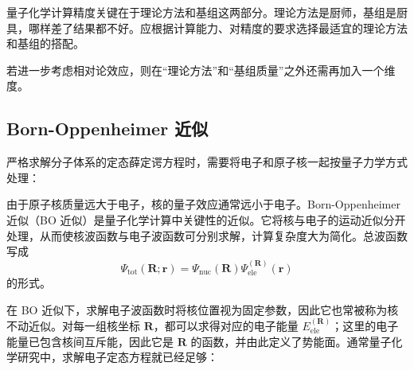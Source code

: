 量子化学计算精度关键在于理论方法和基组这两部分。理论方法是厨师，基组是厨具，哪样差了结果都不好。应根据计算能力、对精度的要求选择最适宜的理论方法和基组的搭配。

\begin{center}
\end{center}

若进一步考虑相对论效应，则在“理论方法”和“基组质量”之外还需再加入一个维度。

\subsection*{Born-Oppenheimer 近似}

严格求解分子体系的定态薛定谔方程时，需要将电子和原子核一起按量子力学方式处理：

\begin{center}
\setlength{\fboxsep}{10pt}
\end{center}

由于原子核质量远大于电子，核的量子效应通常远小于电子。Born-Oppenheimer 近似（BO 近似）是量子化学计算中关键性的近似。它将核与电子的运动近似分开处理，从而使核波函数与电子波函数可分别求解，计算复杂度大为简化。总波函数写成
\[
\Psi_{\mathrm{tot}}(\mathbf R;\mathbf r)=\Psi_{\mathrm{nuc}}(\mathbf R)\Psi_{\mathrm{ele}}^{(\mathbf R)}(\mathbf r)
\]
的形式。

在 BO 近似下，求解电子波函数时将核位置视为固定参数，因此它也常被称为核不动近似。对每一组核坐标 $\mathbf R$，都可以求得对应的电子能量 $E_{\mathrm{ele}}^{(\mathbf R)}$；这里的电子能量已包含核间互斥能，因此它是 $\mathbf R$ 的函数，并由此定义了势能面。通常量子化学研究中，求解电子定态方程就已经足够：

\begin{center}
\setlength{\fboxsep}{10pt}
\end{center}

